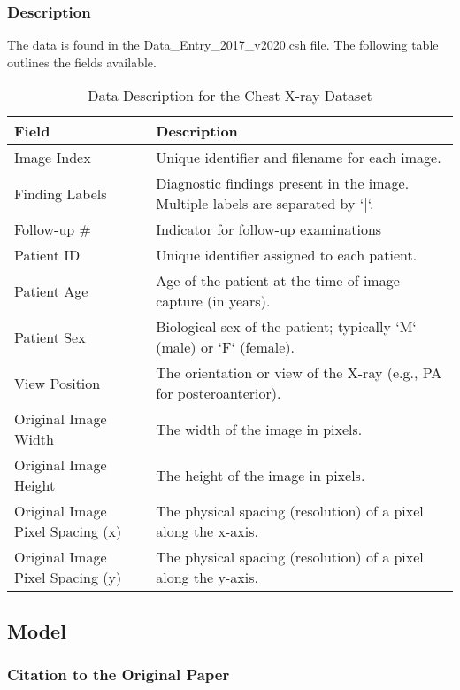\documentclass[letterpaper]{article} %
\begin{document}
\subsubsection{Description}
The data is found in the Data_Entry_2017_v2020.csh file. The following table outlines the fields available.
\begin{table}[ht]
    \centering
    \caption{Data Description for the Chest X-ray Dataset}
    \begin{tabular}{l p{8cm} }
        \hline
        \textbf{Field} & \textbf{Description} \\
        \hline
        Image Index & Unique identifier and filename for each image. \\
        Finding Labels & Diagnostic findings present in the image. Multiple labels are separated by `|`. \\
        Follow-up #& Indicator for follow-up examinations\\
        Patient ID & Unique identifier assigned to each patient. \\
        Patient Age & Age of the patient at the time of image capture (in years). \\
        Patient Sex & Biological sex of the patient; typically `M` (male) or `F` (female). \\
        View Position & The orientation or view of the X-ray (e.g., PA for posteroanterior). \\
        Original Image Width & The width of the image in pixels. \\
        Original Image Height & The height of the image in pixels. \\
        Original Image Pixel Spacing (x) & The physical spacing (resolution) of a pixel along the x-axis. \\
        Original Image Pixel Spacing (y) & The physical spacing (resolution) of a pixel along the y-axis. \\
        \hline
    \end{tabular}
\end{table}

\subsection{Model}

\subsubsection{Citation to the Original Paper}
\end{document}
